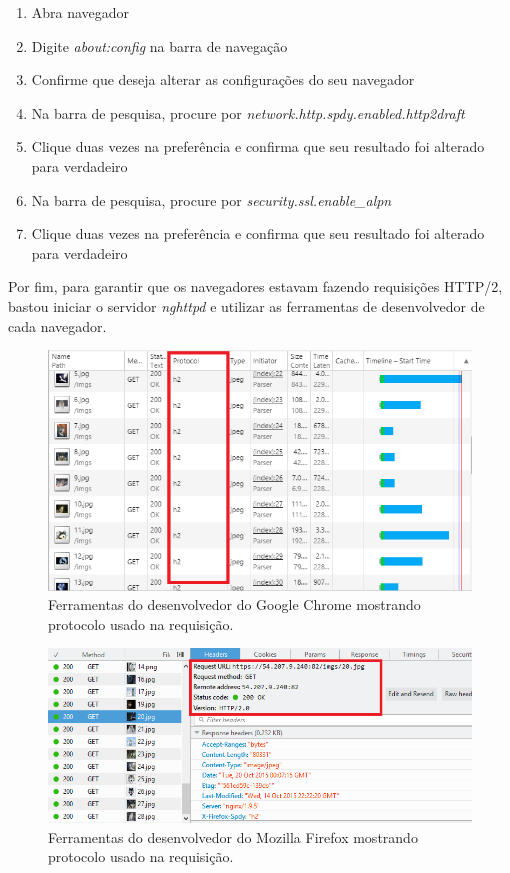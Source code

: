 \begin{enumerate}
	\item Abra navegador
	\item Digite \textit{about:config} na barra de navegação
	\item Confirme que deseja alterar as configurações do seu navegador
	\item Na barra de pesquisa, procure por \textit{network.http.spdy.enabled.http2draft}
	\item Clique duas vezes na preferência e confirma que seu resultado foi alterado para verdadeiro
	\item Na barra de pesquisa, procure por \textit{security.ssl.enable\_alpn}
	\item Clique duas vezes na preferência e confirma que seu resultado foi alterado para verdadeiro	
\end{enumerate}

Por fim, para garantir que os navegadores estavam fazendo requisições HTTP/2, bastou iniciar o servidor \textit{nghttpd} e utilizar as ferramentas de desenvolvedor de cada navegador.

\begin{figure}[!htb]
    \centering
    \caption{Ferramentas do desenvolvedor do Google Chrome mostrando protocolo usado na requisição.}
    \includegraphics[width=1.0\textwidth]{./04-figuras/desenvolvimento/http2_chrome}
\end{figure}

\begin{figure}[!htb]
    \centering
    \caption{Ferramentas do desenvolvedor do Mozilla Firefox mostrando protocolo usado na requisição.}
    \includegraphics[width=1.0\textwidth]{./04-figuras/desenvolvimento/http2_firefox}
\end{figure}

